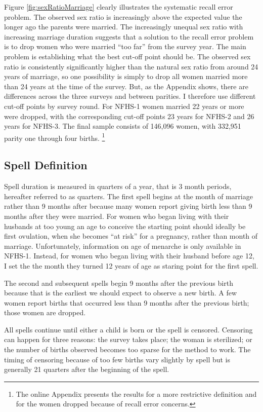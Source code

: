 \documentclass[12pt,letterpaper]{article}
\begin{document}
Figure \ref{fig:sexRatioMarriage} clearly illustrates the systematic recall error
problem.
The observed sex ratio is increasingly above the expected value the
longer ago the parents were married.
The increasingly unequal sex ratio with increasing marriage duration suggests that
a solution to the recall error problem is to drop women who were married ``too far'' from 
the survey year.
The main problem is establishing what the best cut-off point should be.
The observed sex ratio is consistently significantly higher than the natural sex ratio 
from around 24 years of marriage, so one possibility is simply to drop all women married 
more than 24 years at the time of the survey.
But, as the Appendix shows, there are differences across the three surveys and between 
parities.
I therefore use different cut-off points by survey round.
For NFHS-1 women married 22 years or more were dropped, with the corresponding cut-off 
points 23 years for NFHS-2  and 26 years for NFHS-3.
The final sample consists of 146,096 women, with 332,951 parity one through four births.%
\footnote{
The online Appendix presents the results for a more restrictive definition and for the
women dropped because of recall error concerns.
}


\subsection{Spell Definition\label{sec:spell_def}}

Spell duration is measured in quarters of a year, that is 3 month periods, hereafter
referred to as quarters.
The first spell begins at the month of marriage rather than 9 months after because many 
women report giving birth less than 9 months after they were married.
For women who began living with their husbands at too young an age to conceive the 
starting point should ideally be first ovulation, when she becomes ``at risk'' for a 
pregnancy, rather than month of marriage.
Unfortunately, information on age of menarche is only available in NFHS-1.
Instead, for women who began living with their husband before age 12, I set the 
the month they turned 12 years of age as staring point for the first spell.

The second and subsequent spells begin 9 months after the previous birth 
because that is the earliest we should expect to observe a new birth.
A few women report births that occurred less than 9 months 
after the previous birth; those women are dropped.

All spells continue until either a child is born or the spell is censored.
Censoring can happen for three reasons:
the survey takes place;
the woman is sterilized;
or the number of births observed becomes too sparse for the method to work.
The timing of censoring because of too few births vary slightly by spell but is generally 
21 quarters after the beginning of the spell.
\end{document}
